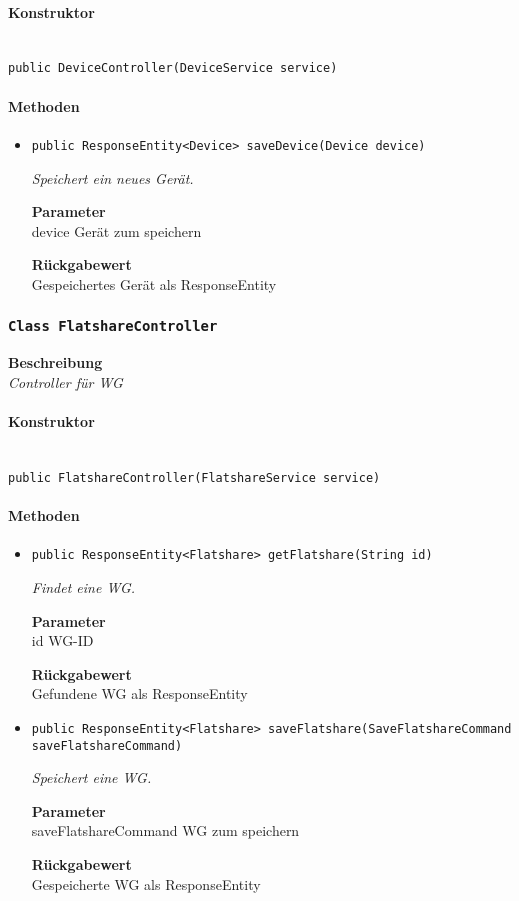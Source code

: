     \paragraph*{Konstruktor}\mbox{} \\
    \texttt{public DeviceController(DeviceService service)} \\
    \paragraph*{Methoden}
    \begin{itemize}
    	\item{\texttt{public ResponseEntity<Device> saveDevice(Device device)}}
    	
    	\textit{Speichert ein neues Gerät.}
    	
    	\textbf{Parameter} \\
    	device Gerät zum speichern
    	
    	\textbf{Rückgabewert} \\
    	Gespeichertes Gerät als ResponseEntity
    \end{itemize}
    \subsubsection{\texttt{Class FlatshareController}}
    \textbf{Beschreibung} \\
    \textit{Controller für WG}
    \paragraph*{Konstruktor}\mbox{} \\
    \texttt{public FlatshareController(FlatshareService service)} \\
    \paragraph*{Methoden}
    \begin{itemize}
    	\item{\texttt{public ResponseEntity<Flatshare> getFlatshare(String id)}}
    	
    	\textit{Findet eine WG.}
    	
    	\textbf{Parameter} \\
    	id WG-ID
    	
    	\textbf{Rückgabewert} \\
    	Gefundene WG als ResponseEntity        \item{\texttt{public ResponseEntity<Flatshare> saveFlatshare(SaveFlatshareCommand saveFlatshareCommand)}}
    	
    	\textit{Speichert eine WG.}
    	
    	\textbf{Parameter} \\
    	saveFlatshareCommand WG zum speichern
    	
    	\textbf{Rückgabewert} \\
    	Gespeicherte WG als ResponseEntity
    \end{itemize}
